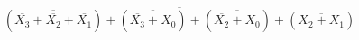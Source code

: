 \documentclass[preview]{standalone}
\begin{document}
\begin{align*}
\overline{\left(\overline{\overline{X_3}+\overline{X_2}+\overline{X_1}}\right)+\left(\overline{\overline{X_3}+X_0}\right)+\left( \overline{\overline{X_2}+X_0}\right)+\left(\overline{X_2+X_1}\right)}
\end{align*}
\end{document}
